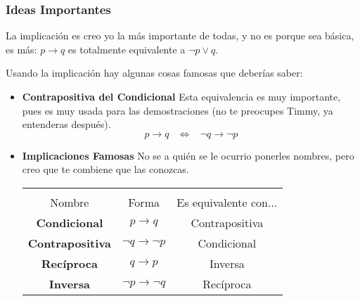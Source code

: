 \documentclass[12pt]{report}                                    %
\DeclareMathOperator \Space {\quad}                             %
\DeclareMathOperator \MiniSpace {\;}                            %
\newcommand \lequal {\MiniSpace \Leftrightarrow \MiniSpace}     %
\begin{document}
            \subsubsection*{Ideas Importantes}

                La implicación es creo yo la más importante de todas, y no es porque sea básica, 
                es más: $p \to q$ es totalmente equivalente a $\lnot p \lor q$.

                Usando la implicación hay algunas cosas famosas que deberías saber:

                \begin{itemize}
                    \item \textbf{Contrapositiva del Condicional}
                            Esta equivalencia es muy importante, pues es muy usada para las demostraciones
                            (no te preocupes Timmy, ya entenderas después).
                            \begin{equation*}
                                p \to q \lequal \lnot q \to \lnot p
                            \end{equation*}

                    \item \textbf{Implicaciones Famosas}
                            No se a quién se le ocurrio ponerles nombres, pero creo que te combiene
                            que las conozcas.

                            \begin{tabular}{ |c|c|c| } 
                                \hline &&\\
                                \large{Nombre} & \large{Forma} & \large{Es equivalente con...}      \\[0.5em]
                                \hline \hline
                                
                                \textbf{Condicional}    & $p \to q$             & Contrapositiva    \\ \hline
                                \textbf{Contrapositiva} & $\lnot q \to \lnot p$ & Condicional       \\ \hline\hline 
                                
                                \textbf{Recíproca}      & $q \to p$             & Inversa           \\ \hline
                                \textbf{Inversa}        & $\lnot p \to \lnot q$ & Recíproca         \\ \hline
                            \end{tabular}
                \end{itemize}
\end{document}
